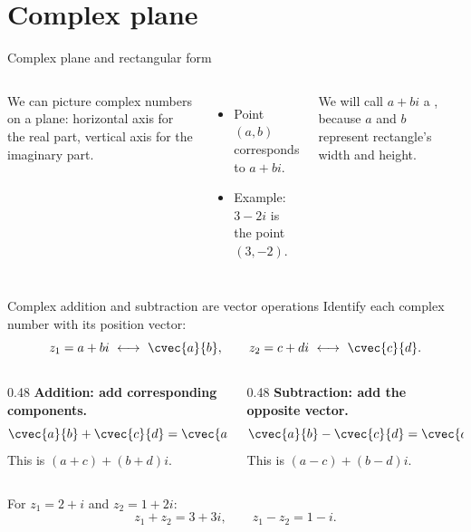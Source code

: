 \section[Plane]{Complex plane}
\frame{\sectionpage}

\begin{frame}{Complex plane and rectangular form}
  \begin{columns}
      We can picture complex numbers on a plane: horizontal axis for the real part, vertical axis for the imaginary part.
      \begin{itemize}
        \item Point $(a,b)$ corresponds to $a+bi$.
        \item Example: $3-2i$ is the point $(3,-2)$.
      \end{itemize}
     We will call $a+bi$ a , because $a$ and $b$ represent rectangle's width and height.
      \begin{center}
      \end{center}
    \end{columns}
\end{frame}
\begin{frame}{Complex addition and subtraction are vector operations}
\small
Identify each complex number with its position vector:
\[
z_1=a+bi\ \longleftrightarrow\ \cvec{a}{b},\qquad
z_2=c+di\ \longleftrightarrow\ \cvec{c}{d}.
\]
\begin{columns}[T]
\begin{column}{0.48\textwidth}
\textbf{Addition: add corresponding components.}
\[
\cvec{a}{b}+\cvec{c}{d}=\cvec{a+c}{b+d}
\]
This is $(a+c)+(b+d)i$.
\end{column}
\begin{column}{0.48\textwidth}
\textbf{Subtraction: add the opposite vector.}
\[
\cvec{a}{b}-\cvec{c}{d}=\cvec{a-c}{b-d}
\]
This is $(a-c)+(b-d)i$.
\end{column}
\end{columns}
\medskip
For $z_1=2+i$ and $z_2=1+2i$:
\[
z_1+z_2=3+3i,\qquad z_1-z_2=1-i.
\]
\end{frame}


